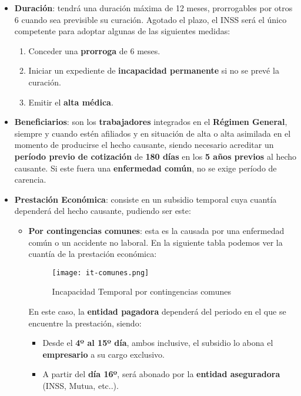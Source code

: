 \begin{itemize}
    \item \textbf{Duración}: tendrá una duración máxima de 12 meses, prorrogables por otros 6 cuando sea previsible su curación. Agotado el plazo, el INSS será el único competente para adoptar algunas de las siguientes medidas:
    \begin{enumerate}
        \item Conceder una \textbf{prorroga} de 6 meses.
        \item Iniciar un expediente de \textbf{incapacidad permanente} si no se prevé la curación.
        \item Emitir el \textbf{alta médica}.
    \end{enumerate}

    \item \textbf{Beneficiarios}: son los \textbf{trabajadores} integrados en el \textbf{Régimen General}, siempre y cuando estén afiliados y en situación de alta o alta asimilada en el momento de producirse el hecho causante, siendo necesario acreditar un \textbf{período previo de cotización} de \textbf{180 días} en los \textbf{5 años previos} al hecho causante. Si este fuera una \textbf{enfermedad común}, no se exige período de carencia.

    \item \textbf{Prestación Económica}: consiste en un subsidio temporal cuya cuantía dependerá del hecho causante, pudiendo ser este:

    \begin{itemize}
        \item \textbf{Por contingencias comunes}: esta es la causada por una enfermedad común o un accidente no laboral. En la siguiente tabla podemos ver la cuantía de la prestación económica:

        \begin{figure}[H]
            \centering
            \texttt{[image: it-comunes.png]}
            \caption{Incapacidad Temporal por contingencias comunes}
        \end{figure}

        En este caso, la \textbf{entidad pagadora} dependerá del periodo en el que se encuentre la prestación, siendo:

        \begin{itemize}
            \item Desde el \textbf{4º al 15º día}, ambos inclusive, el subsidio lo abona el \textbf{empresario} a su cargo exclusivo.
            \item A partir del \textbf{día 16º}, será abonado por la \textbf{entidad aseguradora} (INSS, Mutua, etc..).
        \end{itemize}


\end{itemize}
\end{itemize}
